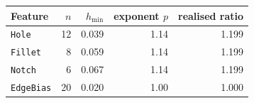 \begin{tabular}{@{}l r r r r@{}}
\toprule
Feature & $n$ & $h_{\min}$ & exponent $p$ & realised ratio \\
\midrule
\texttt{Hole} & 12 & 0.039 & 1.14 & 1.199 \\
\texttt{Fillet} & 8 & 0.059 & 1.14 & 1.199 \\
\texttt{Notch} & 6 & 0.067 & 1.14 & 1.199 \\
\texttt{EdgeBias} & 20 & 0.020 & 1.00 & 1.000 \\
\bottomrule
\end{tabular}
